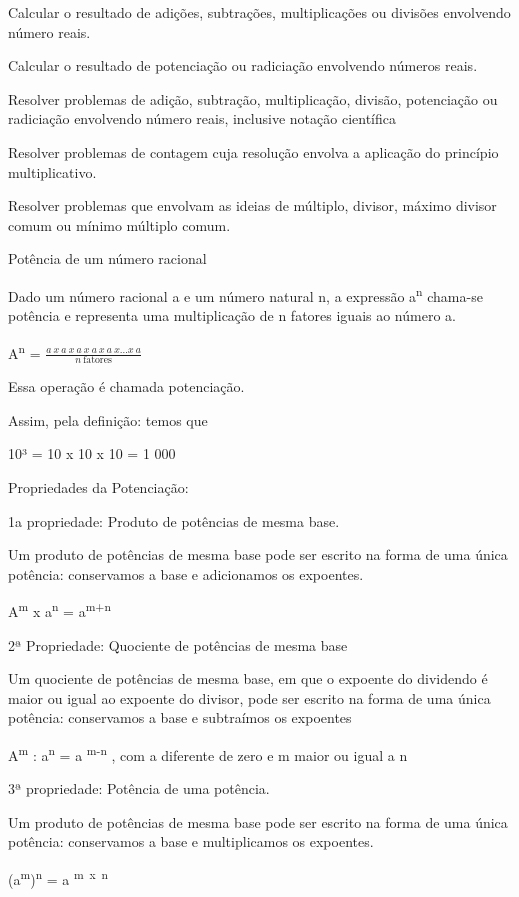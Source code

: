 Calcular o resultado de adições, subtrações, multiplicações ou divisões
envolvendo número reais.

Calcular o resultado de potenciação ou radiciação envolvendo números
reais.

Resolver problemas de adição, subtração, multiplicação, divisão,
potenciação ou radiciação envolvendo número reais, inclusive notação
científica

Resolver problemas de contagem cuja resolução envolva a aplicação do
princípio multiplicativo.

Resolver problemas que envolvam as ideias de múltiplo, divisor, máximo
divisor comum ou mínimo múltiplo comum.

Potência de um número racional

Dado um número racional a e um número natural n, a expressão
a\textsuperscript{n} chama-se potência e representa uma multiplicação de
n fatores iguais ao número a.

A\textsuperscript{n} =
\(\frac{a\ x\ a\ x\ a\ x\ a\ x\ a\ x\ldots x\ a}{n\ \text{fatores}}\)

Essa operação é chamada potenciação.

Assim, pela definição: temos que

10³ = 10 x 10 x 10 = 1 000

Propriedades da Potenciação:

1a propriedade: Produto de potências de mesma base.

Um produto de potências de mesma base pode ser escrito na forma de uma
única potência: conservamos a base e adicionamos os expoentes.

A\textsuperscript{m} x a\textsuperscript{n} = a\textsuperscript{m+n}

2ª Propriedade: Quociente de potências de mesma base

Um quociente de potências de mesma base, em que o expoente do dividendo
é maior ou igual ao expoente do divisor, pode ser escrito na forma de
uma única potência: conservamos a base e subtraímos os expoentes

A\textsuperscript{m} : a\textsuperscript{n} = a \textsuperscript{m-n} ,
com a diferente de zero e m maior ou igual a n

3ª propriedade: Potência de uma potência.

Um produto de potências de mesma base pode ser escrito na forma de uma
única potência: conservamos a base e multiplicamos os expoentes.

(a\textsuperscript{m})\textsuperscript{n} = a \textsuperscript{m~x~n}

